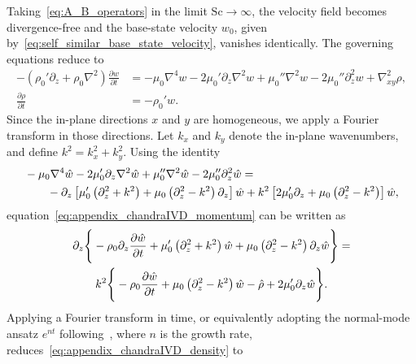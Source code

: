 \documentclass[11pt]{article}
\newcommand{\Sch}{\mathrm{Sc}}
\newenvironment{appen}{\appendix}{}
\begin{document}
\begin{appen}
Taking~\eqref{eq:A_B_operators} in the limit \(\Sch \to \infty\), the velocity field becomes divergence-free and the base-state velocity \(w_0\), given by~\eqref{eq:self_similar_base_state_velocity}, vanishes identically. The governing equations reduce to
\begin{subequations}
\begin{align}
    \label{eq:appendix_chandraIVD_momentum}
    -\left(
        \rho_0' \partial_z
        +
        \rho_0 \nabla^2
     \right)
     \frac{\partial w}{\partial t}
    &=
    -\mu_0 \nabla^4 w
    -2\mu_0' \partial_z \nabla^2 w
    +\mu_0'' \nabla^2 w
    -2\mu_0'' \partial_z^2 w
    +\nabla_{xy}^2\rho,
    \\
    \label{eq:appendix_chandraIVD_density}
    \frac{\partial \rho}{\partial t}
    &=
    -\rho_0' w.
\end{align}
\end{subequations}
Since the in-plane directions \(x\) and \(y\) are homogeneous, we apply a Fourier transform in those directions. Let \(k_x\) and \(k_y\) denote the in-plane wavenumbers, and define \(k^2 = k_x^2 + k_y^2\). Using the identity
\begin{align}
    &-\mu_0 \nabla^4 \hat{w}
    -2\mu_0' \partial_z \nabla^2 \hat{w}
    +\mu_0'' \nabla^2 \hat{w}
    -2\mu_0'' \partial_z^2 \hat{w}
    =
    \notag\\
    &\qquad
    -\partial_z
    \left[
        \mu_0'
        \left(
            \partial_z^2 + k^2
        \right)
        +
        \mu_0
        \left(
            \partial_z^2 - k^2
        \right)\partial_z
    \right]\hat{w}
    +
    k^2
    \left[
        2\mu_0' \partial_z
        +
        \mu_0
        \left(
            \partial_z^2 - k^2
        \right)
    \right]\hat{w},
\end{align}
equation~\eqref{eq:appendix_chandraIVD_momentum} can be written as
\begin{align}
\label{eq:appendix_chandraIVD_momentum_fourier}
&\partial_z
\Bigg\{
    -\rho_0
    \partial_z
    \frac{\partial \hat{w}}{\partial t}
    +
    \mu_0'
    \left(
        \partial_z^2 + k^2
    \right)\hat{w}
    +
    \mu_0
    \left(
        \partial_z^2 - k^2
    \right)
    \partial_z \hat{w}
\Bigg\}
=
\notag\\
&\qquad
k^2
\Bigg\{
    -\rho_0
    \frac{\partial \hat{w}}{\partial t}
    +
    \mu_0
    \left(
        \partial_z^2 - k^2
    \right)\hat{w}
    -
    \hat{\rho}
    +
    2\mu_0' \partial_z \hat{w}
\Bigg\}.
\end{align}
Applying a Fourier transform in time, or equivalently adopting the normal-mode ansatz \(e^{nt}\) following~\citet{chandrasekhar-1961}, where \(n\) is the growth rate, reduces~\eqref{eq:appendix_chandraIVD_density} to

\end{appen}
\end{document}
